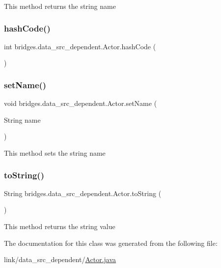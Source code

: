 This method returns the string name \hypertarget{classbridges_1_1data__src__dependent_1_1_actor_a78e29e54c8a200ddbcbae2e0eb323722}{}\label{classbridges_1_1data__src__dependent_1_1_actor_a78e29e54c8a200ddbcbae2e0eb323722} 
\subsubsection{\texorpdfstring{hash\+Code()}{hashCode()}}
{\footnotesize\ttfamily int bridges.\+data\+\_\+src\+\_\+dependent.\+Actor.\+hash\+Code (\begin{DoxyParamCaption}{ }\end{DoxyParamCaption})}

\hypertarget{classbridges_1_1data__src__dependent_1_1_actor_a8a3650b446402d511bb4fe99827ff90a}{}\label{classbridges_1_1data__src__dependent_1_1_actor_a8a3650b446402d511bb4fe99827ff90a} 
\subsubsection{\texorpdfstring{set\+Name()}{setName()}}
{\footnotesize\ttfamily void bridges.\+data\+\_\+src\+\_\+dependent.\+Actor.\+set\+Name (\begin{DoxyParamCaption}\item[{String}]{name }\end{DoxyParamCaption})}

This method sets the string name \hypertarget{classbridges_1_1data__src__dependent_1_1_actor_a5210a5b38a4a311b92e7332aeddb65ff}{}\label{classbridges_1_1data__src__dependent_1_1_actor_a5210a5b38a4a311b92e7332aeddb65ff} 
\subsubsection{\texorpdfstring{to\+String()}{toString()}}
{\footnotesize\ttfamily String bridges.\+data\+\_\+src\+\_\+dependent.\+Actor.\+to\+String (\begin{DoxyParamCaption}{ }\end{DoxyParamCaption})}

This method returns the string value 

The documentation for this class was generated from the following file\+:\begin{DoxyCompactItemize}
\item 
link/data\+\_\+src\+\_\+dependent/\hyperlink{_actor_8java}{Actor.\+java}\end{DoxyCompactItemize}
